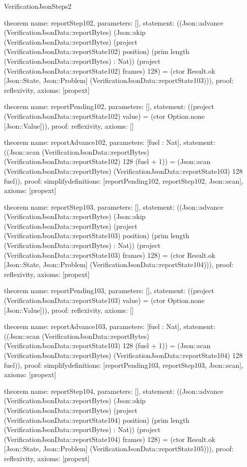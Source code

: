 \begin{lexlean}{VerificationJsonSteps2}
\begin{semanticmodule}
theorem{
  name: reportStep102,
  parameters: [],
  statement: ((Json::advance (VerificationJsonData::reportBytes) (Json::skip (VerificationJsonData::reportBytes) (project (VerificationJsonData::reportState102) position) (prim length (VerificationJsonData::reportBytes) : Nat)) (project (VerificationJsonData::reportState102) frames) 128) = (ctor Result.ok [Json::State, Json::Problem] (VerificationJsonData::reportState103))),
  proof: reflexivity{},
  axioms: [propext]
}

theorem{
  name: reportPending102,
  parameters: [],
  statement: ((project (VerificationJsonData::reportState102) value) = (ctor Option.none [Json::Value])),
  proof: reflexivity{},
  axioms: []
}

theorem{
  name: reportAdvance102,
  parameters: [fuel : Nat],
  statement: ((Json::scan (VerificationJsonData::reportBytes) (VerificationJsonData::reportState102) 128 (fuel + 1)) = (Json::scan (VerificationJsonData::reportBytes) (VerificationJsonData::reportState103) 128 fuel)),
  proof: simplify{definitions: [reportPending102, reportStep102, Json::scan]},
  axioms: [propext]
}

theorem{
  name: reportStep103,
  parameters: [],
  statement: ((Json::advance (VerificationJsonData::reportBytes) (Json::skip (VerificationJsonData::reportBytes) (project (VerificationJsonData::reportState103) position) (prim length (VerificationJsonData::reportBytes) : Nat)) (project (VerificationJsonData::reportState103) frames) 128) = (ctor Result.ok [Json::State, Json::Problem] (VerificationJsonData::reportState104))),
  proof: reflexivity{},
  axioms: [propext]
}

theorem{
  name: reportPending103,
  parameters: [],
  statement: ((project (VerificationJsonData::reportState103) value) = (ctor Option.none [Json::Value])),
  proof: reflexivity{},
  axioms: []
}

theorem{
  name: reportAdvance103,
  parameters: [fuel : Nat],
  statement: ((Json::scan (VerificationJsonData::reportBytes) (VerificationJsonData::reportState103) 128 (fuel + 1)) = (Json::scan (VerificationJsonData::reportBytes) (VerificationJsonData::reportState104) 128 fuel)),
  proof: simplify{definitions: [reportPending103, reportStep103, Json::scan]},
  axioms: [propext]
}

theorem{
  name: reportStep104,
  parameters: [],
  statement: ((Json::advance (VerificationJsonData::reportBytes) (Json::skip (VerificationJsonData::reportBytes) (project (VerificationJsonData::reportState104) position) (prim length (VerificationJsonData::reportBytes) : Nat)) (project (VerificationJsonData::reportState104) frames) 128) = (ctor Result.ok [Json::State, Json::Problem] (VerificationJsonData::reportState105))),
  proof: reflexivity{},
  axioms: [propext]
}


\end{semanticmodule}
\end{lexlean}
